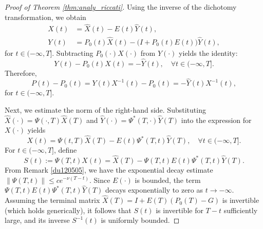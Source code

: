 \documentclass{IEEEtran}
\begin{document}
\begin{proof}[Proof of Theorem \ref{thm:analy_riccati}]
		Using the inverse of the dichotomy transformation, we obtain
		\begin{equation}\label{inv_trans_XY}
			\begin{aligned}
				X(t) &= \hat{X}(t) - E(t)\hat{Y}(t), \\
				Y(t) &= P_0(t)\hat{X}(t) - \big(I+P_0(t)E(t)\big)\hat{Y}(t),
			\end{aligned}
		\end{equation} for $t\in(-\infty,T]$.
		Subtracting $P_0(\cdot)X(\cdot)$ from $Y(\cdot)$ yields the identity:
		\begin{equation}
			Y(t) - P_0(t)X(t) = -\hat{Y}(t),\quad \forall t\in(-\infty,T].
		\end{equation}
		Therefore,
		\begin{equation}\label{P_error_exact}
			P(t) - P_0(t) = Y(t)X^{-1}(t) - P_0(t) = -\hat{Y}(t)X^{-1}(t),
		\end{equation}for $t\in(-\infty,T]$.
		
		Next, we estimate the norm of the right-hand side. Substituting $\hat{X}(\cdot) = \Psi(\cdot,T)\hat{X}(T)$ and $\hat{Y}(\cdot) = \Psi^*(T,\cdot)\hat{Y}(T)$ into the expression for $X(\cdot)$ yields
		\begin{equation}
			X(t) = \Psi(t,T)\hat{X}(T) - E(t)\Psi^*(T,t)\hat{Y}(T),\quad\forall t\in(-\infty,T].
		\end{equation}
		For $t\in(-\infty,T]$, define
		\begin{equation}
			S(t) := \Psi(T,t)X(t) = \hat{X}(T) - \Psi(T,t)E(t)\Psi^*(T,t)\hat{Y}(T).
		\end{equation}
		From Remark \ref{du120505}, we have the exponential decay estimate $\|\Psi(T,t)\| \leq c e^{-\nu(T-t)}$. Since $E(\cdot)$ is bounded, the term $\Psi(T,t)E(t)\Psi^*(T,t)\hat{Y}(T)$ decays exponentially to zero as $t \to -\infty$. Assuming the terminal matrix $\hat{X}(T) = I + E(T)(P_0(T)-G)$ is invertible (which holds generically), it follows that $S(t)$ is invertible for $T-t$ sufficiently large, and its inverse $S^{-1}(t)$ is uniformly bounded. 
		

\end{proof}
\end{document}
